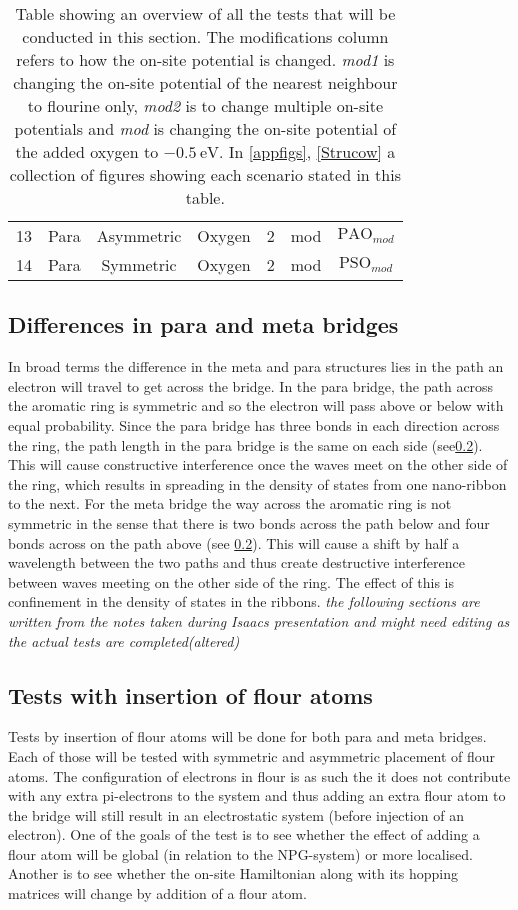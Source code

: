 \begin{table}[ht]
\begin{tabular}{ccccccc}
		13   & Para  & Asymmetric & Oxygen                         & 2       & mod                            & \(\text{PAO}_{mod}\)       \\
		14   & Para  & Symmetric  & Oxygen                         & 2       & mod                            & \(\text{PSO}_{mod}\)       \\
		\bottomrule
	\end{tabular}
	\caption{Table showing an overview of all the tests that will be conducted in this section. The modifications column refers to how the on-site potential is changed. \textit{mod1} is changing the on-site potential of the nearest neighbour to flourine only, \textit{mod2} is to change multiple on-site potentials and \textit{mod} is changing the on-site potential of the added oxygen to \(\SI{-0.5}{\electronvolt}\). In \cref{appfigs}, \cref{Strucow} a collection of figures showing each scenario stated in this table.}
	\label{testtable}
\end{table}
\subsection{Differences in para and meta bridges}
In broad terms the difference in the meta and para structures lies in the path an electron will travel to get across the bridge. In the para bridge, the path across the aromatic ring is symmetric and so the electron will pass above or below with equal probability. Since the para bridge has three bonds in each direction across the ring, the path length in the para bridge is the same on each side (see\cref{}). This will cause constructive interference once the waves meet on the other side of the ring, which results in spreading in the density of states from one nano-ribbon to the next. For the meta bridge the way across the aromatic ring is not symmetric in the sense that there is two bonds across the path below and four bonds across on the path above (see \cref{}). This will cause a shift by half a wavelength between the two paths and thus create destructive interference between waves meeting on the other side of the ring. The effect of this is confinement in the density of states in the ribbons.
\textit{the following sections are written from the notes taken during Isaacs presentation and might need editing as the actual tests are completed(altered)}
\subsection{Tests with insertion of flour atoms}
Tests by insertion of flour atoms will be done for both para and meta bridges. Each  of those will be tested with symmetric and asymmetric placement of flour atoms. The configuration of electrons in flour is as such the it does not contribute with any extra pi-electrons to the system and thus adding an extra flour atom to the bridge will still result in an electrostatic system (before injection of an electron). One of the goals of the test is to see whether the effect of adding a flour atom will be global (in relation to the NPG-system) or more localised. Another is to see whether the on-site Hamiltonian along with its hopping matrices will change by addition of a flour atom.
